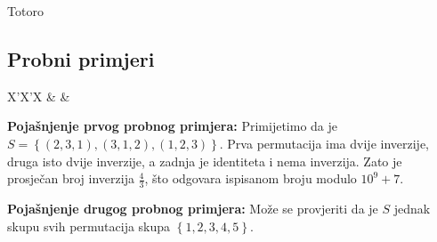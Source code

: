 \begin{statement}[
  problempoints=100,
  timelimit=1 sekunda,
  memorylimit=512 MiB,
]{Totoro}
\subsection*{Probni primjeri}
\begin{tabularx}{\textwidth}{X'X'X}
 &
 &
\end{tabularx}

\textbf{Pojašnjenje prvog probnog primjera:}
Primijetimo da je $S = \left\{ (2, 3, 1), (3, 1, 2), (1, 2, 3)\right\}$.
Prva permutacija ima dvije inverzije, druga isto dvije inverzije, a zadnja
je identiteta i nema inverzija. Zato je prosječan broj inverzija $\frac{4}{3}$,
što odgovara ispisanom broju modulo $10^9 + 7$.

\textbf{Pojašnjenje drugog probnog primjera:}
Može se provjeriti da je $S$ jednak skupu svih permutacija skupa 
$\left\{1, 2, 3, 4, 5 \right\}$. 

\end{statement}

